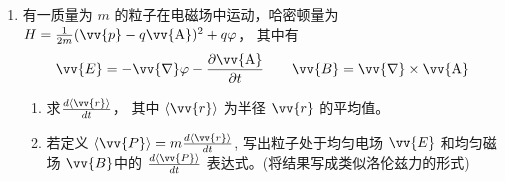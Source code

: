 \begin{enumerate}
{\begin{enumerate}
		\item 第一次测量（$t/2$ 时刻）得到 $S_z=+\hbar/2$ 的概率为 $\cos^2(\omega t/4)$。测量后态塌缩为 $|+\rangle_z$，继续演化到 $t$ 时刻，再次测得 $S_z=+\hbar/2$ 的概率仍为 $\cos^2(\omega t/4)$。故两次均得 $+\hbar/2$ 的概率为
		\[
		P_2=\cos^4\!\left(\frac{\omega t}{4}\right).
		\]
		
		\item 每次测量间隔 $\Delta t=t/N$。若前一次测得 $S_z=+\hbar/2$，则态为 $|+\rangle_z$，下一次测得 $S_z=+\hbar/2$ 的概率为 $\cos^2(\omega t/(2N))$。$N$ 次均得 $+\hbar/2$ 的概率为
		\[
		P_N=\cos^{2N}\!\left(\frac{\omega t}{2N}\right).
		\]
		令 $x=\omega t/(2N)$，则
		\[
		P_N=[\cos x]^{\omega t/x}.
		\]
		当 $N\to+\infty$ 时 $x\to0$，利用 $\ln\cos x=-x^2/2+O(x^4)$，得
		\[
		\ln P_N=2N\ln\cos x=\omega t\cdot\frac{\ln\cos x}{x}\to0,
		\]
		故
		\[
		\lim_{N\to+\infty}P_N=1.
		\]
		此即量子 Zeno 效应：无限频繁测量使系统始终停留在初态。
	\end{enumerate}
}



\item 
有一质量为 $m$ 的粒子在电磁场中运动，哈密顿量为 $H=\frac{1}{2 m}(\vv{p}-q \vv{\mathrm{A}})^{2}+q \varphi$， 其中有
\[ 
\vv{E}=-\vv{\nabla} \varphi-\frac{\partial \vv{\mathrm{A}}}{\partial t}  \qquad \vv{B}=\vv{\nabla} \times \vv{\mathrm{A}}
 \]
\begin{enumerate}
	\item
	求$\frac{d\braket{\vv{r}}}{d t}$， 其中 $\braket{\vv{r}}$ 为半径 $\vv{r}$ 的平均值。
	
	\item 
	若定义 $\braket{\vv{P}}=m \frac{d\braket{\vv{r}}}{d t}$, 写出粒子处于均匀电场 $ \vv{E} $ 和均匀磁场 $ \vv{B}  $中的 $\frac{d\langle\vv{P}\rangle}{d t}$ 表达式。(将结果写成类似洛伦兹力的形式)
	
\end{enumerate}

\end{enumerate}
